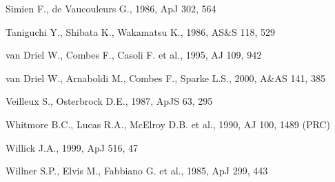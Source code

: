 \begin{thebibliography}{}
  Simien
F., de Vaucouleurs G., 1986, ApJ 302, 564

  Taniguchi Y.,
Shibata K., Wakamatsu K., 1986, AS\&S 118, 529

  van Driel W.,
Combes F., Casoli F.  et al., 1995, AJ 109, 942

  van Driel W.,
Arnaboldi M., Combes F., Sparke L.S., 2000, A\&AS 141, 385

 Veilleux S.,
Osterbrock D.E., 1987, ApJS 63, 295

  Whitmore B.C.,
Lucas R.A., McElroy D.B.  et al., 1990, AJ 100, 1489 (PRC)

  Willick  J.A.,  1999, ApJ
516, 47

  Willner  S.P.,
Elvis M., Fabbiano G.  et al., 1985, ApJ 299, 443

\end{thebibliography}

\bsp

\label{lastpage}



